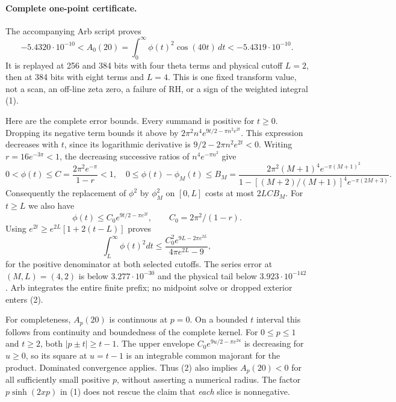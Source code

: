 \paragraph{Complete one-point certificate.}
The accompanying Arb script proves
\[
 -5.4320\cdot10^{-10}
 < A_0(20)=\int_0^\infty\phi(t)^2\cos(40t)\,dt
 < -5.4319\cdot10^{-10}.                                \tag{2}
\]
It is replayed at 256 and 384 bits with four theta terms and physical
cutoff $L=2$, then at 384 bits with eight terms and $L=4$.
This is one fixed transform value, not a scan, an off-line zeta zero,
a failure of RH, or a sign of the weighted integral (1).

Here are the complete error bounds. Every summand is positive for $t\ge0$.
Dropping its negative term bounds it above by
$2\pi^2n^4 e^{9t/2-\pi n^2e^{2t}}$. This expression decreases with $t$,
since its logarithmic derivative is $9/2-2\pi n^2e^{2t}<0$.
Writing $r=16e^{-3\pi}<1$, the decreasing successive ratios of
$n^4e^{-\pi n^2}$ give
\[
 0<\phi(t)\le C=\frac{2\pi^2e^{-\pi}}{1-r}<1,
 \quad
 0\le\phi(t)-\phi_M(t)\le B_M=
 \frac{2\pi^2(M+1)^4e^{-\pi(M+1)^2}}
 {1-[(M+2)/(M+1)]^4e^{-\pi(2M+3)}}.
\]
Consequently the replacement of $\phi^2$ by $\phi_M^2$ on $[0,L]$
costs at most $2LCB_M$. For $t\ge L$ we also have
\[
 \phi(t)\le C_0e^{9t/2-\pi e^{2t}},\qquad C_0=2\pi^2/(1-r).
\]
Using $e^{2t}\ge e^{2L}[1+2(t-L)]$ proves
\[
 \int_L^\infty\phi(t)^2dt
 \le\frac{C_0^2e^{9L-2\pi e^{2L}}}{4\pi e^{2L}-9},
\]
for the positive denominator at both selected cutoffs. The series error
at $(M,L)=(4,2)$ is below $3.277\cdot10^{-30}$ and the physical tail
below $3.923\cdot10^{-142}$. Arb integrates the entire finite prefix;
no midpoint solve or dropped exterior enters (2).

For completeness, $A_p(20)$ is continuous at $p=0$. On a bounded $t$
interval this follows from continuity and boundedness of the complete
kernel. For $0\le p\le1$ and $t\ge2$, both $|p\pm t|\ge t-1$.
The upper envelope $C_0e^{9u/2-\pi e^{2u}}$ is decreasing for $u\ge0$,
so its square at $u=t-1$ is an integrable common majorant for the
product. Dominated convergence applies. Thus (2) also implies
$A_p(20)<0$ for all sufficiently small positive $p$, without asserting
a numerical radius. The factor $p\sinh(2xp)$ in (1) does not rescue the
claim that \emph{each} slice is nonnegative.


